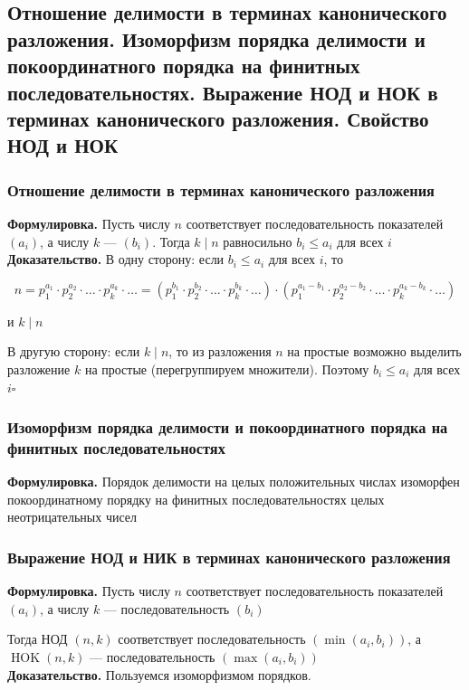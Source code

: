 \documentclass[a4paper]{article}
\newcommand{\qed}{\hfill$\square$}
\begin{document}
\subsection{Отношение делимости в терминах канонического разложения. Изоморфизм порядка делимости и покоординатного порядка на финитных последовательностях. Выражение НОД и НОК в терминах канонического разложения. Свойство НОД и НОК}
\subsubsection*{Отношение делимости в терминах канонического разложения}
\textbf{Формулировка.} Пусть числу $n$ соответствует последовательность показателей $(a_i)$, а числу $k$ — $(b_i)$. Тогда $k \mid n$ равносильно $b_i\leqslant a_i$ для всех $i$\\[2mm]
\indent\textbf{Доказательство.} В одну сторону: если $b_{i} \leqslant a_{i}$ для всех $i$, то

$$n=p_{1}^{a_{1}} \cdot p_{2}^{a_{2}} \cdot \ldots \cdot p_{k}^{a_{k}} \cdot \ldots=\left(p_{1}^{b_{1}} \cdot p_{2}^{b_{2}} \cdot \ldots \cdot p_{k}^{b_{k}} \cdot \ldots\right) \cdot\left(p_{1}^{a_{1}-b_{1}} \cdot p_{2}^{a_{2}-b_{2}} \cdot \ldots \cdot p_{k}^{a_{k}-b_{k}} \cdot \ldots\right)$$

и $k \mid n$

В другую сторону: если $k \mid n$, то из разложения $n$ на простые возможно выделить разложение $k$ на простые (перегруппируем множители). Поэтому $b_{i} \leqslant a_{i}$ для всех $i$\qed


\subsubsection*{Изоморфизм порядка делимости и покоординатного порядка на финитных последовательностях}
\textbf{Формулировка.} Порядок делимости на целых положительных числах изоморфен покоординатному порядку на финитных последовательностях целых неотрицательных чисел

\subsubsection*{Выражение НОД и НИК в терминах канонического разложения}
\textbf{Формулировка.} Пусть числу $n$ соответствует последовательность показателей $\left(a_{i}\right)$, а числу $k$ — последовательность $\left(b_{i}\right)$

Тогда НОД $(n, k)$ соответствует последовательность $\left(\min \left(a_{i}, b_{i}\right)\right)$, а $\operatorname{HOK}(n, k)$ — последовательность $\left(\max \left(a_{i}, b_{i}\right)\right)$\\[2mm]
\indent\textbf{Доказательство.} Пользуемся изоморфизмом порядков.
\end{document}

